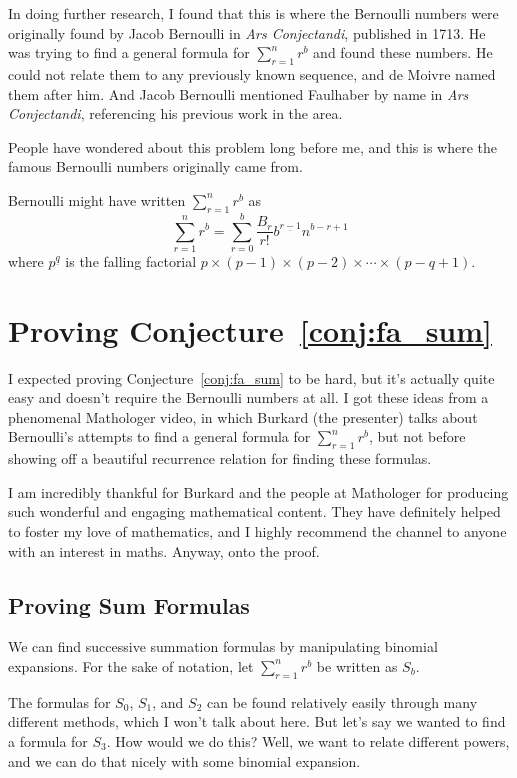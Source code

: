 \documentclass[a4paper]{article}
\newcommand{\sn}{\sum\limits_{r=1}^{n}}
\begin{document}
In doing further research, I found that this is where the Bernoulli numbers were originally found by Jacob Bernoulli in \textit{Ars Conjectandi}, published in 1713. He was trying to find a general formula for $\sn r^b$ and found these numbers. He could not relate them to any previously known sequence, and de Moivre named them after him. And Jacob Bernoulli mentioned Faulhaber by name in \textit{Ars Conjectandi}, referencing his previous work in the area.\cite{wikipedia-bernoulli-numbers}

People have wondered about this problem long before me, and this is where the famous Bernoulli numbers originally came from.

Bernoulli might have written $\sn r^b$ as $$\sn r^b = \sum_{r=0}^b \frac{B_r}{r!} b^{\underline{r-1}} n^{b-r+1}$$ where $p^{\underline{q}}$ is the falling factorial $p \times (p-1) \times (p-2) \times \cdots \times (p-q+1)$.

\section{Proving Conjecture~\ref{conj:fa_sum}}

I expected proving Conjecture~\ref{conj:fa_sum} to be hard, but it's actually quite easy and doesn't require the Bernoulli numbers at all. I got these ideas from a phenomenal Mathologer video\cite{mathologer-power-sums}, in which Burkard (the presenter) talks about Bernoulli's attempts to find a general formula for $\sn r^b$, but not before showing off a beautiful recurrence relation for finding these formulas.

I am incredibly thankful for Burkard and the people at Mathologer for producing such wonderful and engaging mathematical content. They have definitely helped to foster my love of mathematics, and I highly recommend the channel to anyone with an interest in maths. Anyway, onto the proof.

\subsection{Proving Sum Formulas}

We can find successive summation formulas by manipulating binomial expansions. For the sake of notation, let $\sn r^b$ be written as $S_b$.

The formulas for $S_0$, $S_1$, and $S_2$ can be found relatively easily through many different methods, which I won't talk about here. But let's say we wanted to find a formula for $S_3$. How would we do this? Well, we want to relate different powers, and we can do that nicely with some binomial expansion.
\end{document}
